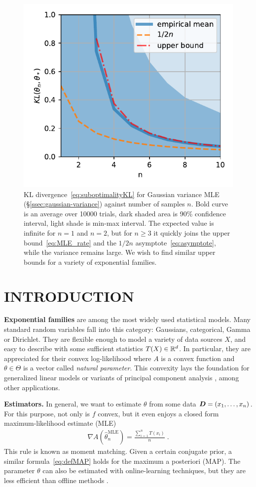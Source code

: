 \documentclass[twoside]{article}
\let\oldsection\section
\renewcommand{\section}[1]{\oldsection{\texorpdfstring{\uppercase{#1}}{#1}}}
\newcommand{\logpart}{A}
\newcommand{\nat}{\theta}
\newcommand{\lin}[1]{\left\langle#1\right\rangle}
\begin{document}
\begin{figure}[t]
	\centering
\includegraphics[width=.4\textwidth]{fewsamples.pdf}
	\caption{KL divergence~\eqref{eq:suboptimalityKL} for Gaussian variance MLE (\S\ref{ssec:gaussian-variance}) against number of samples $n$. Bold curve is an average over 10000 trials,  dark shaded area is 90\% confidence interval, light shade is min-max interval. 
		The expected value is infinite for $n=1$ and $n=2$, but for $n\geq3$ it quickly joins the upper bound~\eqref{eq:MLE_rate} and the $1/2n$ asymptote~\eqref{eq:asymptote}, while the variance remains large.
		We wish to find similar upper bounds for a variety of exponential families.
	}
	\label{fig:curves}
\end{figure}


\section{Introduction}
\label{sec:motivation}

{\bf Exponential families} are among the most widely used statistical models.
Many standard random variables fall into this category: Gaussians, categorical, Gamma or Dirichlet.
They are flexible enough to model a variety of data sources $X$, and easy to describe with some sufficient statistics $T(X) \in \mathbb{R}^d$.
In particular, they are appreciated for their convex log-likelihood
\alignn{
f(\nat) = \E[-\log p_\nat(X)] = \logpart(\nat) - \lin{\E[T(X)] , \nat},
\label{eq:defNLL}
}
where $\logpart$ is a convex function and $\nat\in\Theta$ is a vector called \textit{natural parameter}.
This convexity lays the foundation for generalized linear models \citep{mccullagh1989generalized}
or variants of principal component analysis \citep{collins2001generalization}, among other applications.

{\bf Estimators.}
In general, we want to estimate $\nat$ from some data ${\bm{D}} = (x_1, \dots, x_n)$.
For this purpose, not only is $f$ convex, but it even enjoys a closed form maximum-likelihood estimate (MLE)
\begin{align}
	\nabla \logpart(\hat \nat_n^\text{MLE}) = \frac{\sum_{i=1}^n T(x_i)}{n} \; .
	\label{eq:defMLE}
\end{align}
This rule is known as moment matching.
Given a certain conjugate prior, a similar formula~\eqref{eq:defMAP} holds for the maximum a posteriori (MAP).
The parameter $\theta$ can also be estimated with online-learning techniques, but they are less efficient than offline methods \citep{azoury2001relative,dasgupta2007online}.
\end{document}

